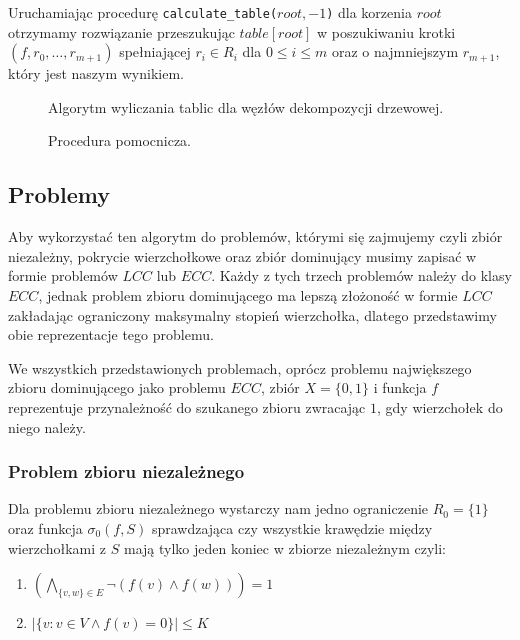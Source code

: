 \documentclass[twoside,a4paper,12pt]{report} %
\theoremstyle{break}
\begin{document}
Uruchamiając procedurę \texttt{calculate\_table($root,-1$)} dla korzenia $root$ otrzymamy rozwiązanie przeszukując $table[root]$ w poszukiwaniu krotki $(f,r_0,\dots,r_{m+1})$ spełniającej $r_i \in R_i$ dla $0\le i \le m$ oraz o najmniejszym $r_{m+1}$, który jest naszym wynikiem.

\begin{figure}[h!]
    \centering
    
    \caption{Algorytm wyliczania tablic dla węzłów dekompozycji drzewowej.}
    \label{create_table}
\end{figure}

\begin{figure}[h!]
    \centering
    
    \caption{Procedura pomocnicza.}
    \label{create_temp}
\end{figure}

\subsection{Problemy}
Aby wykorzystać ten algorytm do problemów, którymi się zajmujemy czyli zbiór niezależny, pokrycie wierzchołkowe oraz zbiór dominujący musimy zapisać w formie problemów $LCC$ lub $ECC$. Każdy z tych trzech problemów należy do klasy $ECC$, jednak problem zbioru dominującego ma lepszą złożoność w formie $LCC$ zakładając ograniczony maksymalny stopień wierzchołka, dlatego przedstawimy obie reprezentacje tego problemu.

We wszystkich przedstawionych problemach, oprócz problemu największego zbioru dominującego jako problemu $ECC$, zbiór $X=\{0,1\}$ i funkcja $f$ reprezentuje przynależność do szukanego zbioru zwracając $1$, gdy wierzchołek do niego należy.

\subsubsection{Problem zbioru niezależnego}
Dla problemu zbioru niezależnego wystarczy nam jedno ograniczenie $R_0 = \{1\}$ oraz funkcja $\sigma_0(f,S)$ sprawdzająca czy wszystkie krawędzie między wierzchołkami z $S$ mają tylko jeden koniec w zbiorze niezależnym czyli:
\begin{enumerate}
    \item $(\bigwedge_{\{v,w\}\in E} \neg(f(v) \wedge f(w))) = 1$
    \item $|\{v \colon v \in V \land f(v)=0\}| \le K$
\end{enumerate}
\end{document}
